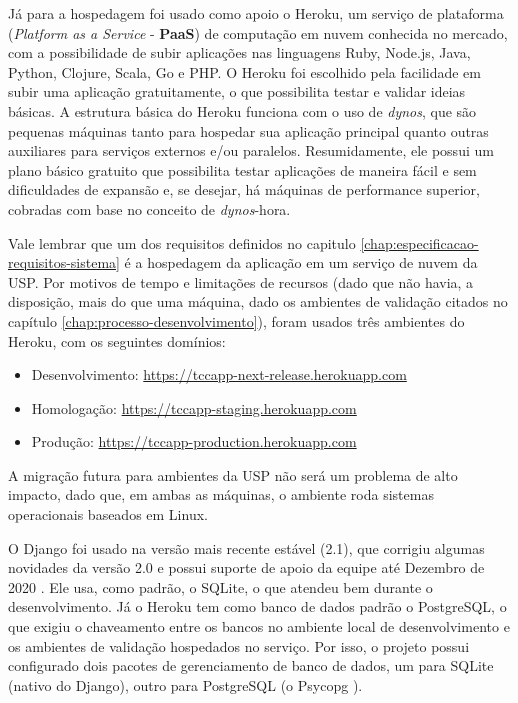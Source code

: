 Já para a hospedagem foi usado como apoio o Heroku, um serviço de plataforma (\textit{Platform as a Service} - \textbf{PaaS}) de computação em nuvem conhecida no mercado, com a possibilidade de subir aplicações nas linguagens Ruby, Node.js, Java, Python, Clojure, Scala, Go e PHP. O Heroku foi escolhido pela facilidade em subir uma aplicação gratuitamente, o que possibilita testar e validar ideias básicas. A estrutura básica do Heroku funciona com o uso de \textit{dynos}, que são pequenas máquinas tanto para hospedar sua aplicação principal quanto outras auxiliares para serviços externos e/ou paralelos. Resumidamente, ele possui um plano básico gratuito que possibilita testar aplicações de maneira fácil e sem dificuldades de expansão e, se desejar, há máquinas de performance superior, cobradas com base no conceito de \textit{dynos}-hora.

Vale lembrar que um dos requisitos definidos no capitulo \ref{chap:especificacao-requisitos-sistema} é a hospedagem da aplicação em um serviço de nuvem da USP. Por motivos de tempo e limitações de recursos (dado que não havia, a disposição, mais do que uma máquina, dado os ambientes de validação citados no capítulo \ref{chap:processo-desenvolvimento}), foram usados três ambientes do Heroku, com os seguintes domínios:

\begin{itemize}
    \item Desenvolvimento: \href{https://tccapp-next-release.herokuapp.com}{https://tccapp-next-release.herokuapp.com}
    \item Homologação: \href{https://tccapp-staging.herokuapp.com}{https://tccapp-staging.herokuapp.com}
    \item Produção: \href{https://tccapp-production.herokuapp.com}{https://tccapp-production.herokuapp.com}
\end{itemize}

A migração futura para ambientes da USP não será um problema de alto impacto, dado que, em ambas as máquinas, o ambiente roda sistemas operacionais baseados em Linux.

O Django foi usado na versão mais recente estável (2.1), que corrigiu algumas novidades da versão 2.0 e possui suporte de apoio da equipe até Dezembro de 2020 \cite{djangodownload}. Ele usa, como padrão, o SQLite, o que atendeu bem durante o desenvolvimento. Já o Heroku tem como banco de dados padrão o PostgreSQL, o que exigiu o chaveamento entre os bancos no ambiente local de desenvolvimento e os ambientes de validação hospedados no serviço. Por isso, o projeto possui configurado dois pacotes de gerenciamento de banco de dados, um para SQLite (nativo do Django), outro para PostgreSQL (o Psycopg \cite{lucassouto2017}).

